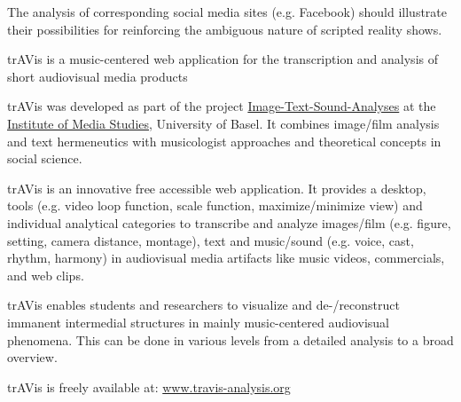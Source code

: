 \documentclass[9pt]{article}
\begin{document}
\noindent The analysis of corresponding social media sites (e.g. Facebook) should illustrate their possibilities for reinforcing the ambiguous nature of scripted reality shows.

\medskip
{}


\bigskip
\bigskip
{}
\newline\noindent\textsf{\large trAVis is a music-centered web application for the transcription and analysis of short audiovisual media products}
\smallskip

\noindent trAVis was developed as part of the project \href{https://populaerkultur.unibas.ch/home/musik-videoclips/musicvideos-en/}{Image-Text-Sound-Analyses} at the \href{http://mewi.unibas.ch/}{Institute of Media Studies}, University of Basel. It combines image/film analysis and text hermeneutics with musicologist approaches and theoretical concepts in social science.
\medskip

\noindent trAVis is an innovative free accessible web application. It provides a desktop, tools (e.g. video loop function, scale function, maximize/minimize view) and individual analytical categories to transcribe and analyze images/film (e.g. figure, setting, camera distance, montage), text and music/sound (e.g. voice, cast, rhythm, harmony) in audiovisual media artifacts like music videos, commercials, and web clips.
\medskip

\noindent trAVis enables students and researchers to visualize and de-/reconstruct immanent intermedial structures in mainly music-centered audiovisual phenomena. This can be done in various levels from a detailed analysis to a broad overview.
\medskip

\noindent trAVis is freely available at: \href{http://www.travis-analysis.org}{www.travis-analysis.org}
\medskip



\smallskip
\end{document}
